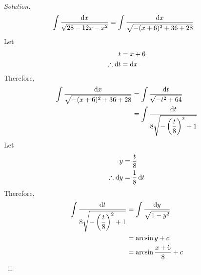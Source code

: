 \documentclass[fleqn, 12pt]{article}
\theoremstyle{definition}
\theoremstyle{theorem}
\newenvironment{solution}
{\begin{proof}[Solution]\let\qed\relax}
	{\end{proof}}
\begin{document}
\begin{solution}
	\begin{align*}
		\int \dfrac{\dif x}{\sqrt{28 - 12x - x^2}} &= \int \dfrac{\dif x}{\sqrt{-(x + 6)^2 + 36 + 28}}
	\end{align*}
	Let 
	\begin{align*}
		t &= x + 6\\
		\therefore \dif t &= \dif x
	\end{align*}
	Therefore,
	\begin{align*}
		\int \dfrac{\dif x}{\sqrt{-(x + 6)^2 + 36 + 28}} &= \int \dfrac{\dif t}{\sqrt{-t^2 + 64}}\\
		&= \int \dfrac{\dif t}{8\sqrt{-\left( \dfrac{t}{8} \right)^2 + 1}}
	\end{align*}
		Let 
		\begin{align*}
		y &= \dfrac{t}{8}\\
		\therefore \dif y &= \dfrac{1}{8} \dif t
		\end{align*}
		Therefore,
		\begin{align*}
			\int \dfrac{\dif t}{8\sqrt{-\left( \dfrac{t}{8} \right)^2 + 1}} &= \int \dfrac{\dif y}{\sqrt{1 - y^2}}\\
			&= \arcsin y + c\\
			&= \arcsin \dfrac{x + 6}{8} + c
		\end{align*}
\end{solution}
\end{document}
